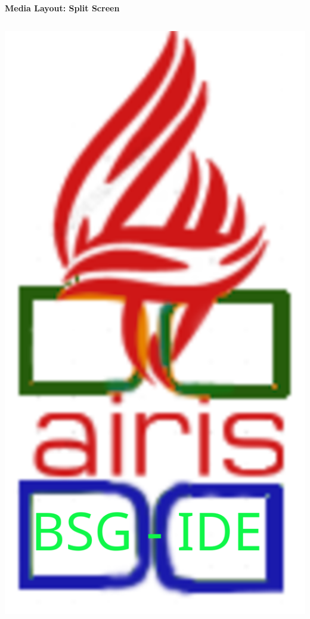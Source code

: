 \documentclass[aspectratio=169]{beamer}
\begin{document}
\begin{frame}{\Large\textbf{Media Layout: Split Screen}}
    \begin{columns}[T]
        \begin{column}{0.48\textwidth}
            \includegraphics[width=\textwidth,keepaspectratio]{bsg-ide.png}
        \end{column}

\end{columns}
\end{frame}
\end{document}
